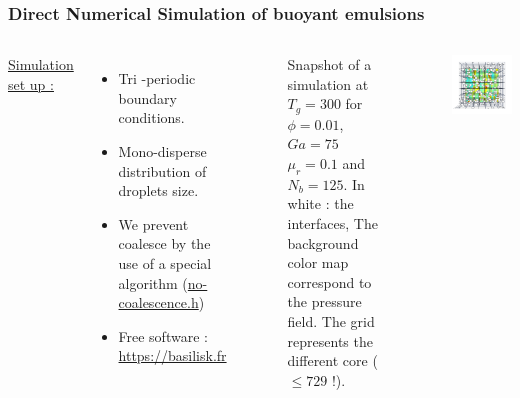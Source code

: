 \documentclass{sintefbeamer}
\begin{document}
\begin{frame}
\frametitle{Direct Numerical Simulation of buoyant emulsions}
\begin{columns}
\underline{Simulation set up :} 
\begin{itemize}
  \item Tri -periodic boundary conditions. 
  \item Mono-disperse distribution of droplets size.
  \item We prevent coalesce by the use of a special algorithm 
  (\href{http://basilisk.fr/sandbox/fintzin/Rising-Suspension/no-coalescence.h}{no-coalescence.h})
  \item Free software : \url{https://basilisk.fr}
\end{itemize}

\begin{figure}
  \caption{Snapshot of a simulation at $T_g = 300$ for $\phi = 0.01$, $Ga = 75$ $\mu_r = 0.1$ and $N_b = 125$. In white : the interfaces, The background color map correspond to the pressure field. The grid represents the different core ($\le 729$ !).
  }
\end{figure}
\centering
\includegraphics[width =  1.1\textwidth]{image/PHI_01_Ga_75.png}
\end{columns}
\end{frame}
\end{document}
